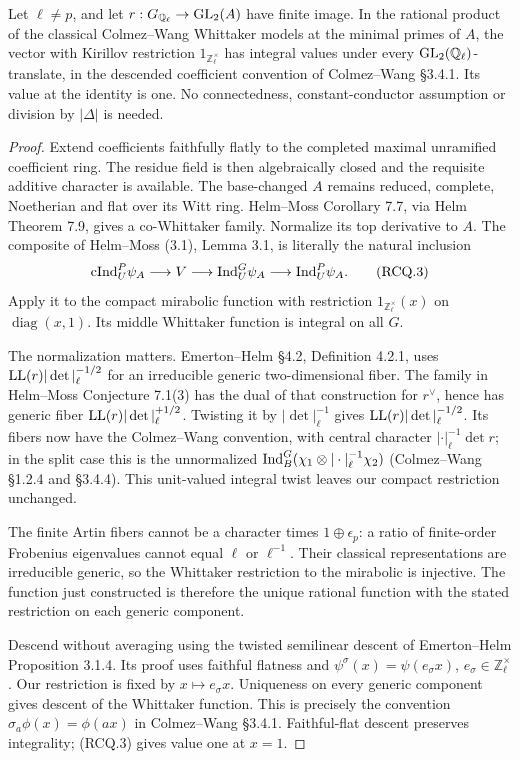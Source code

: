 \begin{lemma}
\label{AC-K33-ray-Schwartz}
Let \(\ell\ne p\), and let
\(r:G_{\mathbb Q_\ell}\to{\rm GL}_2(A)\) have finite image.
In the rational product of the classical Colmez--Wang Whittaker
models at the minimal primes of \(A\), the vector with Kirillov
restriction \(1_{\mathbb Z_\ell^\times}\) has integral values under
every \({\rm GL}_2(\mathbb Q_\ell)\)-translate, in the descended
coefficient convention of Colmez--Wang \S3.4.1. Its value at the
identity is one. No connectedness, constant-conductor assumption
or division by \(|\Delta|\) is needed.
\end{lemma}
\begin{proof}
Extend coefficients faithfully flatly to the completed maximal
unramified coefficient ring. The residue field is then algebraically
closed and the requisite additive character is available. The
base-changed \(A\) remains reduced, complete, Noetherian and flat
over its Witt ring. Helm--Moss Corollary 7.7, via Helm Theorem 7.9,
gives a co-Whittaker family. Normalize its top derivative to \(A\).
The composite of Helm--Moss (3.1), Lemma 3.1, is literally the natural
inclusion
\[
 {\rm cInd}_{U}^{P}\psi_A\longrightarrow V
 \longrightarrow{\rm Ind}_{U}^{G}\psi_A
 \longrightarrow{\rm Ind}_{U}^{P}\psi_A.
 \tag{RCQ.3}
\]
Apply it to the compact mirabolic function with restriction
\(1_{\mathbb Z_\ell^\times}(x)\) on \(\operatorname{diag}(x,1)\).
Its middle Whittaker function is integral on all \(G\).

The normalization matters. Emerton--Helm \S4.2, Definition 4.2.1,
uses \({\rm LL}(r)|\det|_\ell^{-1/2}\) for an irreducible generic
two-dimensional fiber. The family in Helm--Moss Conjecture 7.1(3)
has the dual of that construction for \(r^\vee\), hence has generic
fiber \({\rm LL}(r)|\det|_\ell^{+1/2}\).
Twisting it by \(|\det|_\ell^{-1}\) gives
\({\rm LL}(r)|\det|_\ell^{-1/2}\). Its fibers now have the Colmez--Wang
convention, with central character \(|\cdot|_\ell^{-1}\det r\);
in the split case this is the unnormalized
\({\rm Ind}_B^G(\chi_1\otimes|\cdot|_\ell^{-1}\chi_2)\)
(Colmez--Wang \S1.2.4 and \S3.4.4).
This unit-valued integral twist leaves our compact restriction
unchanged.

The finite Artin fibers cannot be a character times
\(1\oplus\epsilon_p\): a ratio of finite-order Frobenius eigenvalues
cannot equal \(\ell\) or \(\ell^{-1}\).
Their classical representations are irreducible generic, so the
Whittaker restriction to the mirabolic is injective. The function
just constructed is therefore the unique rational function with
the stated restriction on each generic component.

Descend without averaging using the twisted semilinear descent of
Emerton--Helm Proposition 3.1.4. Its proof uses faithful flatness and
\(\psi^\sigma(x)=\psi(e_\sigma x)\),
\(e_\sigma\in\mathbb Z_\ell^\times\).
Our restriction is fixed by \(x\mapsto e_\sigma x\).
Uniqueness on every generic component gives descent of the
Whittaker function. This is precisely the convention
\(\sigma_a\phi(x)=\phi(ax)\) in Colmez--Wang \S3.4.1.
Faithful-flat descent preserves integrality; (RCQ.3) gives value
one at \(x=1\).
\end{proof}
